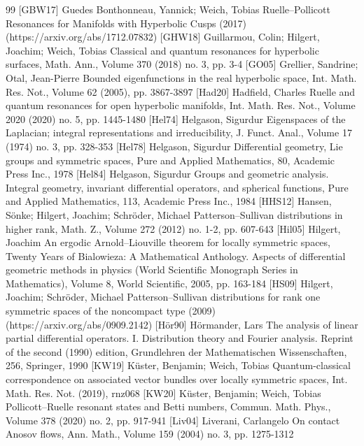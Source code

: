 \documentclass[10pt]{amsart}
\theoremstyle{definition}
\begin{document}
\begin{thebibliography}{99}
 [GBW17] Guedes Bonthonneau, Yannick; Weich, Tobias Ruelle–Pollicott Resonances for Manifolds with Hyperbolic Cusps (2017) (https://arxiv.org/abs/1712.07832)
 [GHW18] Guillarmou, Colin; Hilgert, Joachim; Weich, Tobias Classical and quantum resonances for hyperbolic surfaces, Math. Ann., Volume 370 (2018) no. 3, pp. 3-4
 [GO05] Grellier, Sandrine; Otal, Jean-Pierre Bounded eigenfunctions in the real hyperbolic space, Int. Math. Res. Not., Volume 62 (2005), pp. 3867-3897
 [Had20] Hadfield, Charles Ruelle and quantum resonances for open hyperbolic manifolds, Int. Math. Res. Not., Volume 2020 (2020) no. 5, pp. 1445-1480
 [Hel74] Helgason, Sigurdur Eigenspaces of the Laplacian; integral representations and irreducibility, J. Funct. Anal., Volume 17 (1974) no. 3, pp. 328-353
 [Hel78] Helgason, Sigurdur Differential geometry, Lie groups and symmetric spaces, Pure and Applied Mathematics, 80, Academic Press Inc., 1978
 [Hel84] Helgason, Sigurdur Groups and geometric analysis. Integral geometry, invariant differential operators, and spherical functions, Pure and Applied Mathematics, 113, Academic Press Inc., 1984
 [HHS12] Hansen, Sönke; Hilgert, Joachim; Schröder, Michael Patterson–Sullivan distributions in higher rank, Math. Z., Volume 272 (2012) no. 1-2, pp. 607-643
 [Hil05] Hilgert, Joachim An ergodic Arnold–Liouville theorem for locally symmetric spaces, Twenty Years of Bialowieza: A Mathematical Anthology. Aspects of differential geometric methods in physics (World Scientific Monograph Series in Mathematics), Volume 8, World Scientific, 2005, pp. 163-184
 [HS09] Hilgert, Joachim; Schröder, Michael Patterson–Sullivan distributions for rank one symmetric spaces of the noncompact type (2009) (https://arxiv.org/abs/0909.2142)
 [Hör90] Hörmander, Lars The analysis of linear partial differential operators. I. Distribution theory and Fourier analysis. Reprint of the second (1990) edition, Grundlehren der Mathematischen Wissenschaften, 256, Springer, 1990
 [KW19] Küster, Benjamin; Weich, Tobias Quantum-classical correspondence on associated vector bundles over locally symmetric spaces, Int. Math. Res. Not. (2019), rnz068
 [KW20] Küster, Benjamin; Weich, Tobias Pollicott–Ruelle resonant states and Betti numbers, Commun. Math. Phys., Volume 378 (2020) no. 2, pp. 917-941
 [Liv04] Liverani, Carlangelo On contact Anosov flows, Ann. Math., Volume 159 (2004) no. 3, pp. 1275-1312

\end{thebibliography}
\end{document}
